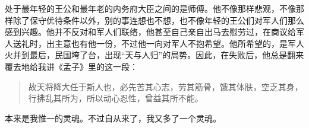 处于最年轻的王公和最年老的内务府大臣之间的是师傅。他不像那样悲观，不像那样除了保守优待条件以外，别的事连想也不想，也不像年轻的王公们对军人们那么感到兴趣。他并不反对和军人们联络，他甚至自己亲自出马去慰劳过，在商议给军人送礼时，出主意也有他一份，不过他一向对军人不抱希望。他所希望的，是军人火并到最后，民国垮了台，出现“天与人归”的局势。因此，在失败后，他总是翻来覆去地给我讲《孟子》里的这一段：\\

\begin{quote}
	故天将降大任于斯人也，必先苦其心志，劳其筋骨，饿其体肤，空乏其身，行拂乱其所为，所以动心忍性，曾益其所不能。\\
\end{quote}

本来是我惟一的灵魂。不过自从来了，我又多了一个灵魂。
